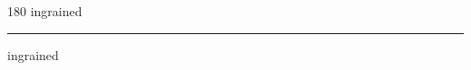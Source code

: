 
\begin{frame}
\begin{center}
\begin{turn}{180}
{\fontsize{2.5cm}{1em}\selectfont ingrained}
\end{turn}
\vspace{1em}\par  
\hrule
\vspace{1em}\par  
{\fontsize{2.5cm}{1em}\selectfont ingrained}
\end{center}
\end{frame}
